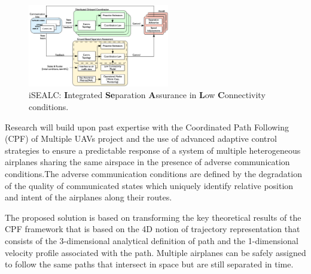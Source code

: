 \documentclass[letter,onecolumn,12pt]{aiaa-tc}
\newcommand{\1}{1_n}
\begin{document}
\vspace{-2mm}
\begin{figure}
\centering
\vspace{-0mm}
\includegraphics[angle=0,width=0.55\textwidth,]{iSEALC.png}
\caption*{\footnotesize iSEALC: \textbf{I}ntegrated \textbf{Se}paration \textbf{A}ssurance in \textbf{L}ow \textbf{C}onnectivity conditions.}
\label{fig:ISEALC}
\end{figure}
\vspace{-1mm}

Research will build upon past expertise with the Coordinated Path Following (CPF) of Multiple UAVs project and the use of advanced adaptive control strategies to ensure a predictable response of a system of multiple heterogeneous airplanes sharing the same airspace in the presence of adverse communication conditions.The adverse communication conditions are defined by the degradation of the quality of communicated states which uniquely identify relative position and intent of the airplanes along their routes.


The proposed solution is based on transforming the key theoretical results of the CPF framework that is based on the 4D notion of trajectory representation that consists of the 3-dimensional analytical definition of path and the 1-dimensional velocity profile associated with the path. Multiple airplanes can be safely assigned to follow the same paths that intersect in space but are still separated in time.
\end{document}
